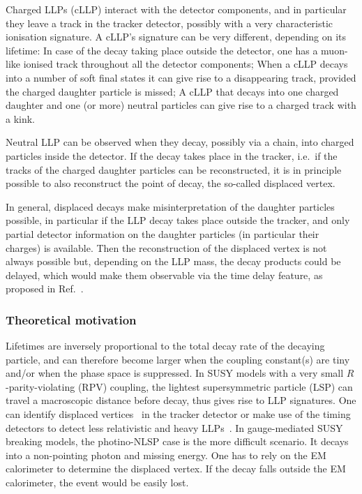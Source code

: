 \documentclass[10pt]{article}
\begin{document}
Charged LLPs (cLLP) interact with the detector components, and in particular they leave a track in the tracker detector, possibly with a very characteristic ionisation signature.
A cLLP's signature can be very different, depending on its lifetime:
In case of the decay taking place outside the detector, one has a muon-like ionised track throughout all the detector components;
When a cLLP decays into a number of soft final states it can give rise to a disappearing track, provided the charged daughter particle is missed;
A cLLP that decays into one charged daughter and one (or more) neutral particles can give rise to a charged track with a kink.

Neutral LLP can be observed when they decay, possibly via a chain, into charged particles inside the detector.
If the decay takes place in the tracker, i.e.\ if the tracks of the charged daughter particles can be reconstructed, it is in principle possible to also reconstruct the point of decay, the so-called displaced vertex.

In general, displaced decays make misinterpretation of the daughter particles possible, in particular if the LLP decay takes place outside the tracker, and only partial detector information on the daughter particles (in particular their charges) is available. Then the reconstruction of the displaced vertex is not always possible but, depending on the LLP mass, the decay products could be delayed, which would make them observable via the time delay feature, as proposed in Ref.~\cite{Liu:2018wte}. 


\subsubsection{Theoretical motivation}
%
Lifetimes are inversely proportional to the total decay rate of the decaying particle, and can therefore become larger when the coupling constant(s) are tiny and/or when the phase space is suppressed.
In SUSY models with a very small $R$-parity-violating (RPV) coupling, the lightest supersymmetric particle (LSP) can travel a macroscopic distance 
before decay, thus gives rise to LLP signatures. One can identify displaced vertices~\cite{Liu:2015bma,Csaki:2015uza,Wang:2019orr} in the tracker detector or make use of the timing detectors to detect less relativistic and heavy LLPs~\cite{Liu:2018wte,Cheung:2021utb}.
In gauge-mediated SUSY breaking models, the photino-NLSP case is the more
difficult scenario. It decays into a non-pointing photon and missing energy.
One has to rely on the EM calorimeter to determine the displaced vertex. 
If the decay falls outside the EM calorimeter, the event would be easily lost.
\end{document}
